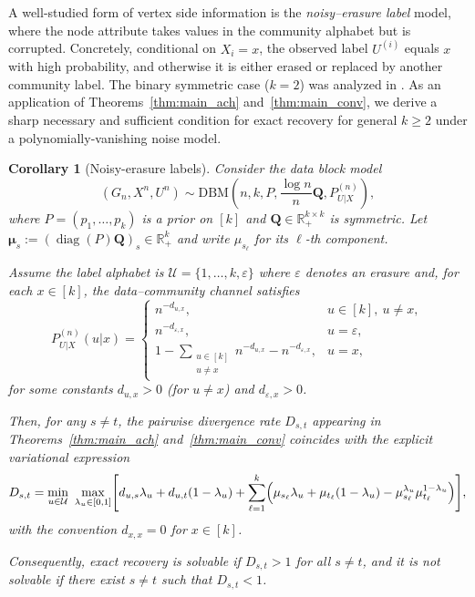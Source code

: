 \documentclass[11pt]{article}
\theoremstyle{plain}
\newtheorem{corollary}[theorem]{Corollary}
\theoremstyle{definition}
\DeclareMathOperator{\diag}{diag}
\begin{document}
A well-studied form of vertex side information is the \emph{noisy--erasure label} model, where the node attribute takes values in the community alphabet but is corrupted.
Concretely, conditional on $X_i=x$, the observed label $U^{(i)}$ equals $x$ with high probability, and otherwise it is either erased or replaced by another community label.
The binary symmetric case ($k=2$) was analyzed in \citep{SN18}.
As an application of Theorems~\ref{thm:main_ach} and~\ref{thm:main_conv}, we derive a sharp necessary and sufficient condition for exact recovery for general $k\ge 2$ under a polynomially-vanishing noise model.

\begin{corollary}[Noisy-erasure labels]\label{cor:noisy_erasure_general_k}
Consider the data block model
\[
(G_n,X^n,U^n)\sim \mathrm{DBM}\!\left(n,k,P,\frac{\log n}{n}\mathbf{Q},P^{(n)}_{U|X}\right),
\]
where $P=(p_1,\dots,p_k)$ is a prior on $[k]$ and $\mathbf{Q}\in\mathbb{R}_+^{k\times k}$ is symmetric.
Let $\bm{\mu}_s := (\diag(P)\mathbf{Q})_s\in\mathbb{R}_+^k$ and write $\mu_{s_\ell}$ for its $\ell$-th component.

Assume the label alphabet is $\mathcal{U}=\{1,\dots,k,\varepsilon\}$ where $\varepsilon$ denotes an erasure and, for each $x\in[k]$, the data--community channel satisfies
\[
P_{U|X}^{(n)}(u|x)=
\begin{cases}
n^{-d_{u,x}}, & u\in[k],\ u\neq x,\\
n^{-d_{\varepsilon,x}}, & u=\varepsilon,\\
1-\displaystyle\sum_{\substack{u\in[k]\\u\neq x}} n^{-d_{u,x}}-n^{-d_{\varepsilon,x}}, & u=x,
\end{cases}
\]
for some constants $d_{u,x}>0$ (for $u\neq x$) and $d_{\varepsilon,x}>0$.

Then, for any $s\neq t$, the pairwise divergence rate $D_{s,t}$ appearing in Theorems~\ref{thm:main_ach} and~\ref{thm:main_conv}
coincides with the explicit variational expression
\[
D_{s,t}
=
\min_{u\in\mathcal{U}}\ \max_{\lambda_u\in[0,1]}
\Biggl[
d_{u,s}\lambda_u+d_{u,t}(1-\lambda_u)
+\sum_{\ell=1}^k\Bigl(\mu_{s_\ell}\lambda_u+\mu_{t_\ell}(1-\lambda_u)-\mu_{s_\ell}^{\lambda_u}\mu_{t_\ell}^{1-\lambda_u}\Bigr)
\Biggr],
\]
with the convention $d_{x,x}=0$ for $x\in[k]$.

Consequently, exact recovery is solvable if $D_{s,t}>1$ for all $s\neq t$, and it is not solvable if there exist $s\neq t$ such that $D_{s,t}<1$.
\end{corollary}
\end{document}
